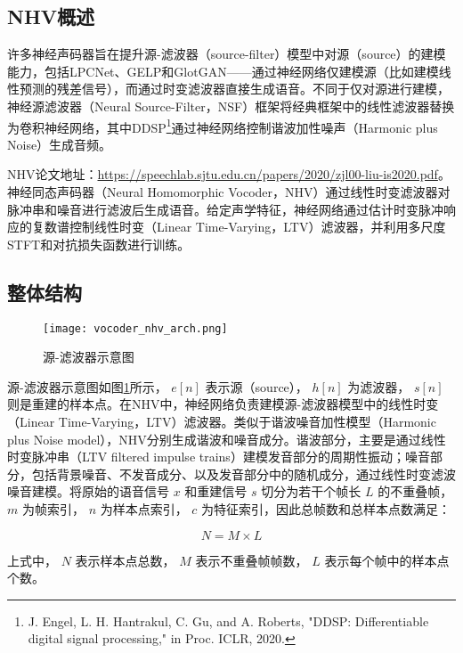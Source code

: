 \documentclass[cn,10pt,math=newtx,citestyle=gb7714-2015,bibstyle=gb7714-2015]{elegantbook}
\begin{document}
\subsection{NHV概述}

许多神经声码器旨在提升源-滤波器（source-filter）模型中对源（source）的建模能力，包括LPCNet、GELP和GlotGAN——通过神经网络仅建模源（比如建模线性预测的残差信号），而通过时变滤波器直接生成语音。不同于仅对源进行建模，神经源滤波器（Neural Source-Filter，NSF）框架将经典框架中的线性滤波器替换为卷积神经网络，其中DDSP\footnote{J. Engel, L. H. Hantrakul, C. Gu, and A. Roberts, "DDSP:
Differentiable digital signal processing," in Proc. ICLR, 2020.}通过神经网络控制谐波加性噪声（Harmonic plus Noise）生成音频。

NHV论文地址：\href{Neural Homomorphic Vocoder}{https://speechlab.sjtu.edu.cn/papers/2020/zjl00-liu-is2020.pdf}。神经同态声码器（Neural Homomorphic Vocoder，NHV）通过线性时变滤波器对脉冲串和噪音进行滤波后生成语音。给定声学特征，神经网络通过估计时变脉冲响应的复数谱控制线性时变（Linear Time-Varying，LTV）滤波器，并利用多尺度STFT和对抗损失函数进行训练。

\subsection{整体结构}

\begin{figure}[htbp]
  \centering
  \texttt{[image: vocoder\_nhv\_arch.png]}
  \caption{源-滤波器示意图 \label{fig:vocoder_nhv_arch}}
\end{figure}

源-滤波器示意图如图\ref{fig:vocoder_nhv_arch}所示， ${e[n]}$ 表示源（source）， $h[n]$ 为滤波器， $s[n]$ 则是重建的样本点。在NHV中，神经网络负责建模源-滤波器模型中的线性时变（Linear Time-Varying，LTV）滤波器。类似于谐波噪音加性模型（Harmonic plus Noise model），NHV分别生成谐波和噪音成分。谐波部分，主要是通过线性时变脉冲串（LTV filtered impulse trains）建模发音部分的周期性振动；噪音部分，包括背景噪音、不发音成分、以及发音部分中的随机成分，通过线性时变滤波噪音建模。将原始的语音信号 $x$ 和重建信号 $s$ 切分为若干个帧长 $L$ 的不重叠帧， $m$ 为帧索引， $n$ 为样本点索引， $c$ 为特征索引，因此总帧数和总样本点数满足：

\begin{equation}
  N=M\times L
\end{equation}

上式中， $N$ 表示样本点总数， $M$ 表示不重叠帧帧数，  $L$ 表示每个帧中的样本点个数。
\end{document}
